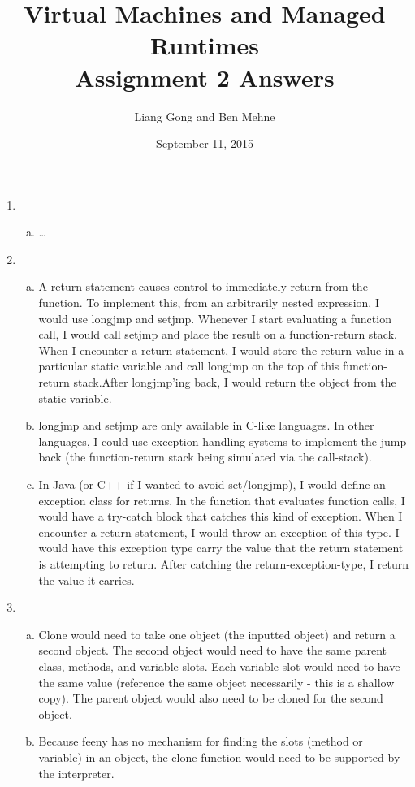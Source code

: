 \documentclass[notitlepage]{report}
\title{\vspace{-0.5in}Virtual Machines and Managed Runtimes \\ Assignment 2 Answers}
\date{\vspace{-0.5in}September 11, 2015}
\author{\vspace{-0.5in}Liang Gong and Ben Mehne\vspace{-0.5in}}
\begin{document}
\maketitle

\begin{enumerate}
	\item
		\begin{enumerate}[(a)]
			\item \dots %
		\end{enumerate}
	\item
		\begin{enumerate}[(a)]
			\item A return statement causes control to immediately return from the function.  To implement this, from an arbitrarily nested expression, I would use longjmp and setjmp.  Whenever I start evaluating a function call, I would call setjmp and place the result on a function-return stack.  When I encounter a return statement, I would store the return value in a particular static variable and call longjmp on the top of this function-return stack.After longjmp'ing back, I would return the object from the static variable.
			\item longjmp and setjmp are only available in C-like languages.  In other languages, I could use exception handling systems to implement the jump back (the function-return stack being simulated via the call-stack).
			\item In Java (or C++ if I wanted to avoid set/longjmp), I would define an exception class for returns.  In the function that evaluates function calls, I would have a try-catch block that catches this kind of exception.  When I encounter a return statement, I would throw an exception of this type.  I would have this exception type carry the value that the return statement is attempting to return.  After catching the return-exception-type, I return the value it carries.
		\end{enumerate}
	\item
		\begin{enumerate}[(a)]
			\item Clone would need to take one object (the inputted object) and return a second object.  The second object would need to have the same parent class, methods, and variable slots.  Each variable slot would need to have the same value (reference the same object necessarily - this is a shallow copy).  The parent object would also need to be cloned for the second object.
			\item Because feeny has no mechanism for finding the slots (method or variable) in an object, the clone function would need to be supported by the interpreter.

\end{enumerate}
\end{enumerate}
\end{document}
